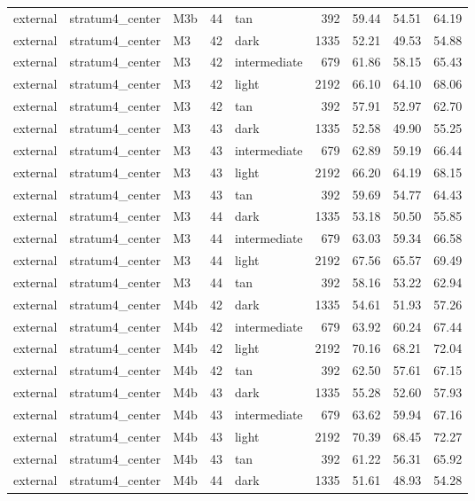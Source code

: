 \begin{tabular}{lllrlrrrr}
external & stratum4\_center & M3b & 44 & tan & 392 & 59.44 & 54.51 & 64.19 \\
external & stratum4\_center & M3 & 42 & dark & 1335 & 52.21 & 49.53 & 54.88 \\
external & stratum4\_center & M3 & 42 & intermediate & 679 & 61.86 & 58.15 & 65.43 \\
external & stratum4\_center & M3 & 42 & light & 2192 & 66.10 & 64.10 & 68.06 \\
external & stratum4\_center & M3 & 42 & tan & 392 & 57.91 & 52.97 & 62.70 \\
external & stratum4\_center & M3 & 43 & dark & 1335 & 52.58 & 49.90 & 55.25 \\
external & stratum4\_center & M3 & 43 & intermediate & 679 & 62.89 & 59.19 & 66.44 \\
external & stratum4\_center & M3 & 43 & light & 2192 & 66.20 & 64.19 & 68.15 \\
external & stratum4\_center & M3 & 43 & tan & 392 & 59.69 & 54.77 & 64.43 \\
external & stratum4\_center & M3 & 44 & dark & 1335 & 53.18 & 50.50 & 55.85 \\
external & stratum4\_center & M3 & 44 & intermediate & 679 & 63.03 & 59.34 & 66.58 \\
external & stratum4\_center & M3 & 44 & light & 2192 & 67.56 & 65.57 & 69.49 \\
external & stratum4\_center & M3 & 44 & tan & 392 & 58.16 & 53.22 & 62.94 \\
external & stratum4\_center & M4b & 42 & dark & 1335 & 54.61 & 51.93 & 57.26 \\
external & stratum4\_center & M4b & 42 & intermediate & 679 & 63.92 & 60.24 & 67.44 \\
external & stratum4\_center & M4b & 42 & light & 2192 & 70.16 & 68.21 & 72.04 \\
external & stratum4\_center & M4b & 42 & tan & 392 & 62.50 & 57.61 & 67.15 \\
external & stratum4\_center & M4b & 43 & dark & 1335 & 55.28 & 52.60 & 57.93 \\
external & stratum4\_center & M4b & 43 & intermediate & 679 & 63.62 & 59.94 & 67.16 \\
external & stratum4\_center & M4b & 43 & light & 2192 & 70.39 & 68.45 & 72.27 \\
external & stratum4\_center & M4b & 43 & tan & 392 & 61.22 & 56.31 & 65.92 \\
external & stratum4\_center & M4b & 44 & dark & 1335 & 51.61 & 48.93 & 54.28 \\

\end{tabular}
